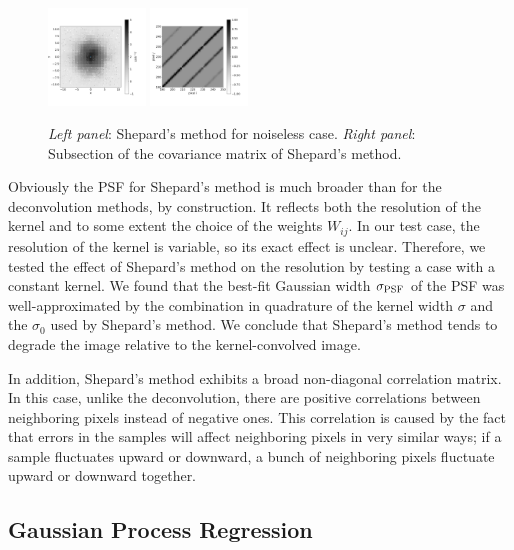 \documentclass[twocolumn,tighten]{aastex61}
\begin{document}
\begin{figure}[t!]
\centering
\includegraphics[width=0.23\textwidth, angle=0]
                {figures/scattered-shepard.png}
\includegraphics[width=0.23\textwidth, angle=0]
                {figures/scattered-shepard-covar.png}
\caption{ \label{fig:scattered-shepard} {\it Left panel}: Shepard's
  method for noiseless case. {\it Right panel}: Subsection of the
  covariance matrix of Shepard's method.}
\end{figure} 

Obviously the PSF for Shepard's method is much broader than for the
deconvolution methods, by construction. It reflects both the
resolution of the kernel and to some extent the choice of the weights
$W_{ij}$. In our test case, the resolution of the kernel is variable,
so its exact effect is unclear. Therefore, we tested the effect of
Shepard's method on the resolution by testing a case with a constant
kernel. We found that the best-fit Gaussian width $\sigma_{\rm PSF}$
of the PSF was well-approximated by the combination in quadrature of
the kernel width $\sigma$ and the $\sigma_0$ used by Shepard's
method. We conclude that Shepard's method tends to degrade the image 
relative to the kernel-convolved image.

In addition, Shepard's method exhibits a broad non-diagonal
correlation matrix. In this case, unlike the deconvolution, there are
positive correlations between neighboring pixels instead of negative
ones. This correlation is caused by the fact that errors in the
samples will affect neighboring pixels in very similar ways; if a
sample fluctuates upward or downward, a bunch of neighboring pixels
fluctuate upward or downward together.

\subsection{Gaussian Process Regression}
\label{sec:gp}
\end{document}
